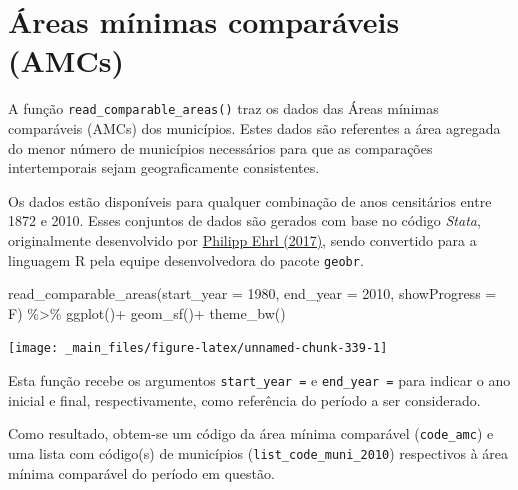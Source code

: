 \documentclass[
  brazilian,
]{book}
\newenvironment{Shaded}{\begin{snugshade}}{\end{snugshade}}
\newcommand{\AttributeTok}[1]{\textcolor[rgb]{0.77,0.63,0.00}{#1}}
\newcommand{\DecValTok}[1]{\textcolor[rgb]{0.00,0.00,0.81}{#1}}
\newcommand{\FunctionTok}[1]{\textcolor[rgb]{0.00,0.00,0.00}{#1}}
\newcommand{\NormalTok}[1]{#1}
\newcommand{\SpecialCharTok}[1]{\textcolor[rgb]{0.00,0.00,0.00}{#1}}
\begin{document}
\hypertarget{uxe1reas-muxednimas-comparuxe1veis-amcs}{%
\section{Áreas mínimas comparáveis (AMCs)}\label{uxe1reas-muxednimas-comparuxe1veis-amcs}}

A função \texttt{read\_comparable\_areas()} traz os dados das Áreas mínimas comparáveis (AMCs) dos municípios. Estes dados são referentes a área agregada do menor número de municípios necessários para que as comparações intertemporais sejam geograficamente consistentes.

Os dados estão disponíveis para qualquer combinação de anos censitários entre 1872 e 2010. Esses conjuntos de dados são gerados com base no código \emph{Stata}, originalmente desenvolvido por \href{https://www.scielo.br/j/ee/a/d87GfsmvZGhsjTQPLpb8hBJ/?lang=en}{Philipp Ehrl (2017)}, sendo convertido para a linguagem R pela equipe desenvolvedora do pacote \texttt{geobr}.

\begin{Shaded}
\begin{Highlighting}[]
\FunctionTok{read\_comparable\_areas}\NormalTok{(}\AttributeTok{start\_year =} \DecValTok{1980}\NormalTok{,}
                      \AttributeTok{end\_year =} \DecValTok{2010}\NormalTok{,}
                      \AttributeTok{showProgress =}\NormalTok{ F) }\SpecialCharTok{\%\textgreater{}\%} 
  \FunctionTok{ggplot}\NormalTok{()}\SpecialCharTok{+}
  \FunctionTok{geom\_sf}\NormalTok{()}\SpecialCharTok{+}
  \FunctionTok{theme\_bw}\NormalTok{()}
\end{Highlighting}
\end{Shaded}

\begin{center}\texttt{[image: \_main\_files/figure-latex/unnamed-chunk-339-1]} \end{center}

Esta função recebe os argumentos \texttt{start\_year\ =} e \texttt{end\_year\ =} para indicar o ano inicial e final, respectivamente, como referência do período a ser considerado.

Como resultado, obtem-se um código da área mínima comparável (\texttt{code\_amc}) e uma lista com código(s) de municípios (\texttt{list\_code\_muni\_2010}) respectivos à área mínima comparável do período em questão.
\end{document}

